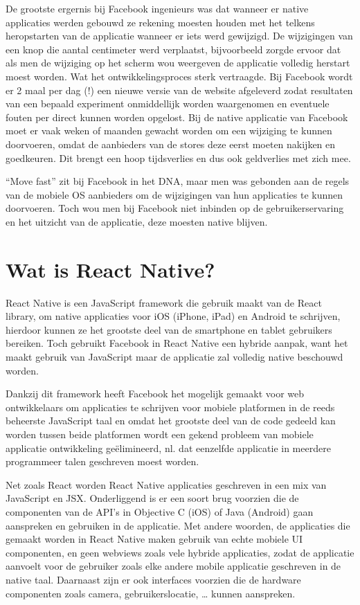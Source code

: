 De grootste ergernis bij Facebook ingenieurs was dat wanneer er native applicaties werden gebouwd ze rekening moesten houden met het telkens heropstarten van de applicatie wanneer er iets werd gewijzigd. De wijzigingen van een knop die aantal centimeter werd verplaatst, bijvoorbeeld zorgde ervoor dat als men de wijziging op het scherm wou weergeven de applicatie volledig herstart moest worden. Wat het ontwikkelingsproces sterk vertraagde. 
Bij Facebook wordt er 2 maal per dag (!) een nieuwe versie van de website afgeleverd zodat resultaten van een bepaald experiment onmiddellijk worden waargenomen en eventuele fouten per direct kunnen worden opgelost. Bij de native applicatie van Facebook moet er vaak weken of maanden gewacht worden om een wijziging te kunnen doorvoeren, omdat de aanbieders van de stores deze eerst moeten nakijken en goedkeuren. Dit brengt een hoop tijdsverlies  en dus ook geldverlies met zich mee. 

``Move fast'' zit bij Facebook in het DNA, maar men was gebonden aan de regels van de mobiele OS aanbieders om de wijzigingen van hun applicaties te kunnen doorvoeren. Toch wou men bij Facebook niet inbinden op de gebruikerservaring en het uitzicht van de applicatie, deze moesten native blijven. \citep{occhino:React}

\section{Wat is React Native?}
React Native is een JavaScript framework die gebruik maakt van de React library, om native applicaties voor iOS (iPhone, iPad) en Android te schrijven, hierdoor kunnen ze het grootste deel van de smartphone en tablet gebruikers bereiken. Toch gebruikt Facebook in React Native een hybride aanpak, want het maakt gebruik van JavaScript maar de applicatie zal volledig native beschouwd worden.

Dankzij dit framework heeft Facebook het mogelijk gemaakt voor web ontwikkelaars om applicaties te schrijven voor mobiele platformen in de reeds beheerste JavaScript taal en omdat het grootste deel van de code gedeeld kan worden tussen beide platformen wordt een gekend probleem van mobiele applicatie ontwikkeling geëlimineerd, nl. dat eenzelfde applicatie in meerdere programmeer talen geschreven moest worden. 

Net zoals React worden React Native applicaties geschreven in een mix van JavaScript en JSX. Onderliggend is er een soort brug voorzien die de componenten van de API’s in Objective C (iOS) of Java (Android) gaan aanspreken en gebruiken in de applicatie. Met andere woorden, de applicaties die gemaakt worden in React Native maken gebruik van echte mobiele UI componenten, en geen webviews zoals vele hybride applicaties, zodat de applicatie aanvoelt voor de gebruiker zoals elke andere mobile applicatie geschreven in de native taal. Daarnaast zijn er ook interfaces voorzien die de hardware componenten zoals camera, gebruikerslocatie, … kunnen aanspreken.

